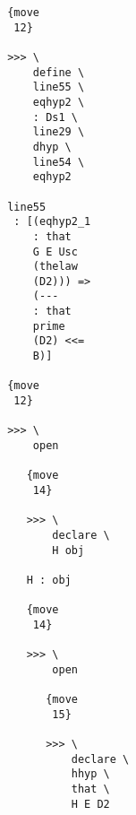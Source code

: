 \documentclass[12pt]{article}
\begin{document}
\begin{verbatim}
                                       {move 
                                        12}

                                       >>> \
                                           define \
                                           line55 \
                                           eqhyp2 \
                                           : Ds1 \
                                           line29 \
                                           dhyp \
                                           line54 \
                                           eqhyp2

                                       line55 
                                        : [(eqhyp2_1 
                                           : that 
                                           G E Usc 
                                           (thelaw 
                                           (D2))) => 
                                           (--- 
                                           : that 
                                           prime 
                                           (D2) <<= 
                                           B)]

                                       {move 
                                        12}

                                       >>> \
                                           open

                                          {move 
                                           14}

                                          >>> \
                                              declare \
                                              H obj

                                          H : obj

                                          {move 
                                           14}

                                          >>> \
                                              open

                                             {move 
                                              15}

                                             >>> \
                                                 declare \
                                                 hhyp \
                                                 that \
                                                 H E D2


\end{verbatim}
\end{document}
